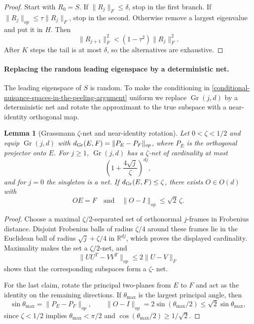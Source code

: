 \documentclass[11pt]{article}
\numberwithin{equation}{section}
\newtheorem{lemma}[theorem]{Lemma}
\theoremstyle{definition}
\theoremstyle{remark}
\newcommand{\R}{\mathbb R}
\newcommand{\1}{\boldsymbol 1}
\begin{document}
\begin{aiblock}
\begin{proof}
  Start with $R_0=S$. If $\|R_j\|_F\le\delta$, stop in
  the first branch. If $\|R_j\|_{op}\le\tau\|R_j\|_F$,
  stop in the second. Otherwise remove a largest
  eigenvalue and put it in $H$. Then
  \[
    \|R_{j+1}\|_F^2<(1-\tau^2)\|R_j\|_F^2.
  \]
  After $K$ steps the tail is at most $\delta$, so the
  alternatives are exhaustive.
\end{proof}

\paragraph{Replacing the random leading eigenspace by a
  deterministic net.} The leading eigenspace of $S$ is
random. To make the conditioning in
\cref{conditional-nuisance-spaces-in-the-peeling-argument}
uniform we replace $\operatorname{Gr}(j,d)$ by a
deterministic net and rotate the approximant to the true
subspace with a near-identity orthogonal map.

\begin{lemma}[Grassmann $\zeta$-net and near-identity
  rotation]\label{lem:grassmann-net}
  Let $0<\zeta<1/2$ and equip $\operatorname{Gr}(j,d)$
  with $d_{\rm Gr}(E,F)=\|P_E-P_F\|_{op}$, where $P_E$ is
  the orthogonal projector onto $E$. For $j\ge1$,
  $\operatorname{Gr}(j,d)$ has a $\zeta$-net of
  cardinality at most
  \[
    \left(1+\frac{4\sqrt j}{\zeta}\right)^{dj},
  \]
  and for $j=0$ the singleton is a net. If
  $d_{\rm Gr}(E,F)\le\zeta$, there exists $O\in O(d)$
  with
  \[
    OE=F\quad\text{and}\quad\|O-I\|_{op}\le\sqrt2\,\zeta.
  \]
\end{lemma}

\begin{proof}
  Choose a maximal $\zeta/2$-separated set of orthonormal
  $j$-frames in Frobenius distance. Disjoint Frobenius
  balls of radius $\zeta/4$ around these frames lie in the
  Euclidean ball of radius $\sqrt j+\zeta/4$ in
  $\R^{dj}$, which proves the displayed cardinality.
  Maximality makes the set a $\zeta/2$-net, and
  \[
    \|UU^{T}-VV^{T}\|_{op}\le2\|U-V\|_{F}
  \]
  shows that the corresponding subspaces form a $\zeta$-
  net.

  For the last claim, rotate the principal two-planes from
  $E$ to $F$ and act as the identity on the remaining
  directions. If $\theta_{\max}$ is the largest principal
  angle, then
  \[
    \sin\theta_{\max}=\|P_E-P_F\|_{op},\qquad
    \|O-I\|_{op}=2\sin(\theta_{\max}/2) \le\sqrt2\sin
    \theta_{\max},
  \]
  since $\zeta<1/2$ implies $\theta_{\max}<\pi/2$ and
  $\cos(\theta_{\max}/2)\ge1/\sqrt2$.
\end{proof}


\end{aiblock}
\end{document}
